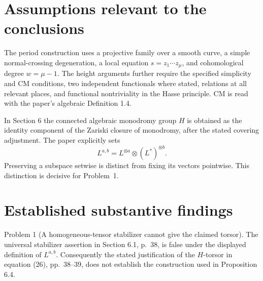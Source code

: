 \documentclass[10pt]{article}
\begin{document}
\section*{Assumptions relevant to the conclusions}
The period construction uses a projective family over a smooth curve, a simple normal-crossing degeneration, a local equation \(s=z_1\cdots z_\mu\), and cohomological degree \(w=\mu-1\). The height arguments further require the specified simplicity and CM conditions, two independent functionals where stated, relations at all relevant places, and functional nontriviality in the Hasse principle. CM is read with the paper’s algebraic Definition 1.4.\par
In Section 6 the connected algebraic monodromy group \(H\) is obtained as the identity component of the Zariski closure of monodromy, after the stated covering adjustment. The paper explicitly sets \[L^{a,b}=L^{\otimes a}\otimes(L^*)^{\otimes b}.\] Preserving a subspace setwise is distinct from fixing its vectors pointwise. This distinction is decisive for Problem 1.\par
\section*{Established substantive findings}
Problem 1 (A homogeneous-tensor stabilizer cannot give the claimed torsor).  The universal stabilizer assertion in Section 6.1, p. 38, is false under the displayed definition of \(L^{a,b}\). Consequently the stated justification of the \(H\)-torsor in equation (26), pp. 38–39, does not establish the construction used in Proposition 6.4.\par
\end{document}

